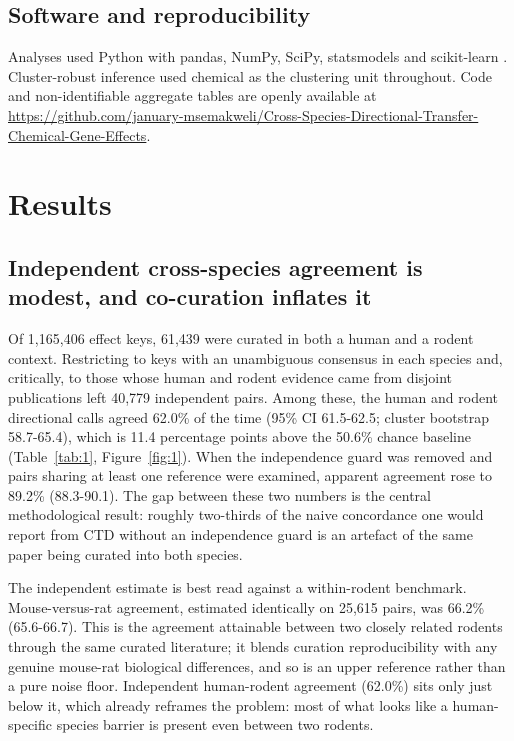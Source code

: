 \documentclass[review,12pt,authoryear]{elsarticle}
\begin{document}
\subsection{Software and reproducibility}

Analyses used Python with pandas, NumPy, SciPy, statsmodels and scikit-learn
\citep{pedregosa2011sklearn}. Cluster-robust inference used chemical as the
clustering unit throughout. Code and non-identifiable aggregate tables are
openly available at
\url{https://github.com/january-msemakweli/Cross-Species-Directional-Transfer-Chemical-Gene-Effects}.

\section{Results}
\label{sec:results}

\subsection{Independent cross-species agreement is modest, and co-curation
inflates it}

Of 1{,}165{,}406 effect keys, 61{,}439 were curated in both a human and a rodent
context. Restricting to keys with an unambiguous consensus in each species and,
critically, to those whose human and rodent evidence came from disjoint
publications left 40{,}779 independent pairs. Among these, the human and rodent
directional calls agreed 62.0\% of the time (95\% CI 61.5-62.5; cluster
bootstrap 58.7-65.4), which is 11.4 percentage points above the 50.6\% chance
baseline (Table~\ref{tab:1}, Figure~\ref{fig:1}). When the independence guard
was removed and pairs sharing at least one reference were examined, apparent
agreement rose to 89.2\% (88.3-90.1). The gap between these two numbers is the
central methodological result: roughly two-thirds of the naive concordance one
would report from CTD without an independence guard is an artefact of the same
paper being curated into both species.

The independent estimate is best read against a within-rodent benchmark.
Mouse-versus-rat agreement, estimated identically on 25{,}615 pairs, was 66.2\%
(65.6-66.7). This is the agreement attainable between two closely related
rodents through the same curated literature; it blends curation reproducibility
with any genuine mouse-rat biological differences, and so is an upper reference
rather than a pure noise floor. Independent human-rodent agreement (62.0\%) sits
only just below it, which already reframes the problem: most of what looks like a
human-specific species barrier is present even between two rodents.
\end{document}
